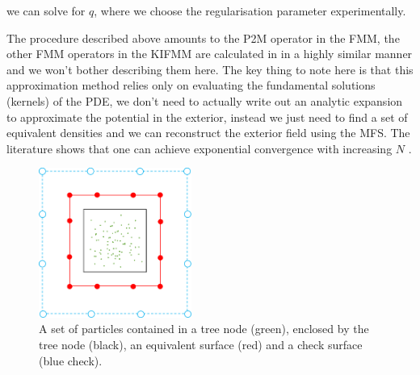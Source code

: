 \documentclass[12pt, a4, twoside]{article}
\begin{document}
we can solve for $q$, where we choose the regularisation parameter experimentally. 

The procedure described above amounts to the P2M operator in the FMM, the other FMM operators in the KIFMM are calculated in in a highly similar manner and we won't bother describing them here. The key thing to note here is that this approximation method relies only on evaluating the fundamental solutions (kernels) of the PDE, we don't need to actually write out an analytic expansion to approximate the potential in the exterior, instead we just need to find a set of equivalent densities and we can reconstruct the exterior field using the MFS. The literature shows that one can achieve exponential convergence with increasing $N$ \cite{barnett2008stability}.

\begin{figure}\label{app:fig:upward_surface}
\centering
\includegraphics[width=5cm]{upward_surface.png}
\caption{A set of particles contained in a tree node (green), enclosed by the tree node (black), an equivalent surface (red) and a check surface (blue check).}
\end{figure}
    
\printbibliography[heading=bibintoc]
\end{document}
